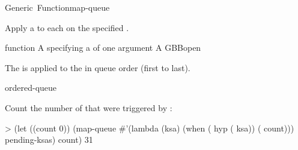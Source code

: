 \documentclass[10pt,twoside,english,pdftex]{article}
\begin{document}

\begin{functiondoc}{Generic~Function}{map-queue}{}
%
%

\fnsyntax

\fnpurpose Apply a  to each  on the
specified .

\fnmethods
{}

\fnpackage {}

\fnmodule {}

\fnargs
\begin{args}{function}
\arg[function] A  specifying a
   of one argument
\arg[queue] A GBBopen 
\end{args}

\fndescription The  is applied to the
 in queue order (first to last).

\begin{alsos}{ordered-queue}
\also[do-queue]
\also[queue]
\end{alsos}

\fnexample
{}%
%
%
Count the number of  that were triggered by
: 
%
\W\supp
\begin{example}
> (let ((count 0))
    (map-queue #'(lambda (ksa)
                   (when ( hyp ( ksa))
                     ( count)))
               pending-ksas)
     count)
31
\end{example}

\end{functiondoc}

\end{document}
